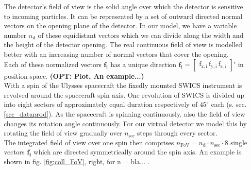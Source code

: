 The detector's field of view is the solid angle over which the detector is sensitive to incoming particles.
It can be represented by a set of outward directed normal vectors on the opening plane of the detector. In our model, we have a variable number $n_\mathrm{d}$ of these equidistant vectors which we can divide along the width and the height of the detector opening. The real continuous field of view is modelled better with an increasing number of normal vectors that cover the opening. \\
Each of these normalized vectors $\mathrm{\mathbf{f_i}}$ has a unique direction $\mathrm{\mathbf{f_i} = \begin{bmatrix}f_{x,i}\,f_{y,i}\,f_{z,i}\end{bmatrix}}'$ in position space. \textbf{(OPT: Plot, An example...)}
\\
With a spin of the Ulysses spacecraft the fixedly mounted SWICS instrument is revolved around the spacecraft spin axis. One revolution of SWICS is divided up into eight sectors of approximately equal duration respectively of $45^\circ$ each (s. sec. \ref{sec_dataprod}). As the spacecraft is spinning continuously, also the field of view changes its rotation angle continuously. For our virtual detector we model this by rotating the field of view gradually over $n_\mathrm{sec}$ steps through every sector.\\
The integrated field of view over one spin then comprises $n_\mathrm{FoV} = n_\mathrm{d} \cdot n_\mathrm{sec} \cdot 8$ single vectors $\mathrm{\mathbf{f_i}}$ which are directed symmetrically around the spin axis. An example is shown in fig. \ref{fig:coll_FoV}, right, for n = bla... .
%
%
%
